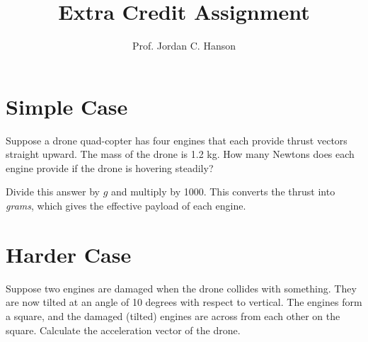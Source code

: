 \documentclass{article}
\begin{document}
\title{Extra Credit Assignment}
\author{Prof. Jordan C. Hanson}

\maketitle

\section{Simple Case}

Suppose a drone quad-copter has four engines that each provide thrust vectors straight upward.  The mass of the drone is 1.2 kg.  How many Newtons does each engine provide if the drone is hovering steadily? \\ \vspace{2cm}

Divide this answer by $g$ and multiply by 1000.  This converts the thrust into \textit{grams}, which gives the effective payload of each engine. \\ \vspace{2cm}

\section{Harder Case}

Suppose two engines are damaged when the drone collides with something.  They are now tilted at an angle of 10 degrees with respect to vertical.  The engines form a square, and the damaged (tilted) engines are across from each other on the square.  Calculate the acceleration vector of the drone.
\end{document}
